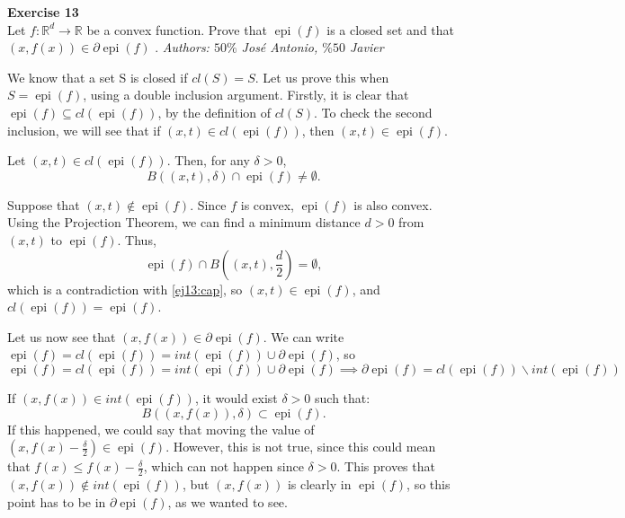 \documentclass[11pt,table]{article}
\newenvironment{problem}[2][Exercise]
{ \begin{mdframed}[backgroundcolor=gray!20] \textbf{#1 #2} \\}
	{\hspace{0.0cm}\newline\newline \emph{Authors: \(50\%\) José Antonio, \(\%50\) Javier}  \end{mdframed}}
\begin{document}
\begin{problem}{13}
Let \( f : \mathbb{R}^d \to \mathbb{R} \) be a convex function. Prove that \( \operatorname{epi}(f) \) is a closed set and that \( (x, f(x)) \in \partial \operatorname{epi}(f) \)  .
\end{problem}

We know that a set S is closed if \(cl(S) = S\). Let us prove this when \(S = \operatorname{epi}(f)\), using a double inclusion argument. Firstly, it is clear that $\operatorname{epi}(f) \subseteq cl(\operatorname{epi}(f))$, by the definition of \(cl(S)\). To check the second inclusion, we will see that if \((x,t)\in cl(\operatorname{epi}(f))\), then \((x,t) \in \operatorname{epi}(f)\).

Let \((x,t)\in cl(\operatorname{epi}(f))\). Then, for any \(\delta > 0\),
\begin{equation}\label{ej13:cap}
	B((x,t),\delta) \cap 	\operatorname{epi}(f) \neq \emptyset.
\end{equation}

Suppose that \((x,t)\notin \operatorname{epi}(f)\). Since \(f\) is convex, \(\operatorname{epi}(f)\) is also convex. Using the Projection Theorem, we can find a minimum distance \(d > 0\) from \((x,t)\) to \(\operatorname{epi}(f)\). Thus,
\[
	\operatorname{epi}(f) \cap B((x,t), \frac{d}{2}) = \emptyset,
\]
which is a contradiction with \eqref{ej13:cap}, so \((x,t) \in \operatorname{epi}(f)\), and \(cl(\operatorname{epi}(f)) = \operatorname{epi}(f)\).

Let us now see that \((x,f(x)) \in \partial \operatorname{epi}(f)\). We can write \(\operatorname{epi}(f) = cl(\operatorname{epi}(f)) = int(\operatorname{epi}(f)) \cup \partial \operatorname{epi}(f)\), so
\[
	\operatorname{epi}(f) = cl(\operatorname{epi}(f)) = int(\operatorname{epi}(f)) \cup \partial \operatorname{epi}(f)	\implies \partial \operatorname{epi}(f) = cl(\operatorname{epi}(f)) \backslash int(\operatorname{epi}(f))
\]

If \((x,f(x)) \in int(\operatorname{epi}(f))\), it would exist \(\delta > 0\) such that:
\[
	B((x,f(x)),\delta) \subset \operatorname{epi}(f).
\]
If this happened, we could say that moving the value of  \((x,f(x)- \frac{\delta}{2}) \in \operatorname{epi}(f) \). However, this is not true, since this could mean that \(f(x) \leq f(x) - \frac{\delta}{2}\), which can not happen since \(\delta > 0\). This proves that \((x,f(x))\notin int(\operatorname{epi}(f))\), but \((x,f(x))\) is clearly in \(\operatorname{epi}(f)\), so this point has to be in \(\partial \operatorname{epi}(f)\), as we wanted to see.
\end{document}
